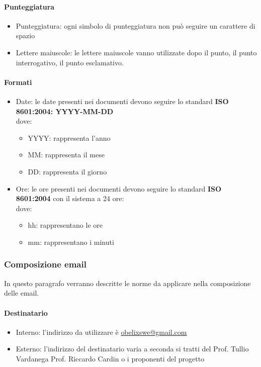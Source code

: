 \paragraph{Punteggiatura}

\begin{itemize}
\item  Punteggiatura: ogni simbolo di punteggiatura non può seguire un carattere di spazio

\item  Lettere maiuscole:  le lettere maiuscole vanno utilizzate dopo
  il punto, il punto interrogativo, il punto esclamativo. 
\end{itemize}

\paragraph{ Formati }
\begin{itemize}
\item Date: le date presenti nei documenti devono seguire lo standard 
\textbf{ISO 8601:2004:  YYYY-MM-DD}\\
  dove:
  \begin{itemize}
  \item YYYY: rappresenta l'anno
  \item MM: rappresenta il mese
  \item DD: rappresenta il giorno
  \end{itemize}

\item Ore: le ore presenti nei documenti devono seguire lo standard 
\textbf{ISO 8601:2004} con il sistema a 24 ore:\\
  dove:
  \begin{itemize}
  \item hh: rappresentano le ore
  \item  mm: rappresentano i minuti
  \end{itemize}
\end{itemize}

\subsubsection{Composizione email}
In questo paragrafo verranno descritte le norme da applicare nella composizione delle email.

\paragraph{Destinatario}
\begin{itemize} 
\item Interno: l'indirizzo da utilizzare è \href{mailto:obelixswe@gmail.com}{obelixswe@gmail.com}
\item Esterno: l'indirizzo del destinatario varia a seconda si tratti del Prof. Tullio Vardanega
  Prof. Riccardo Cardin o i proponenti del progetto
\end{itemize}
